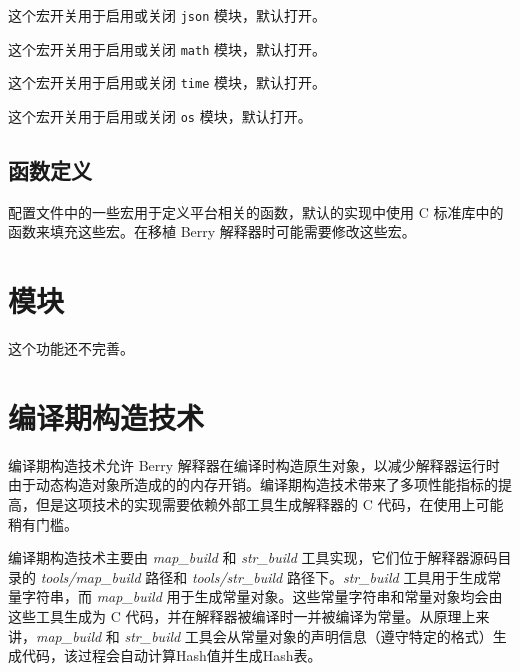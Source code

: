 这个宏开关用于启用或关闭 \texttt{json} 模块，默认打开。


这个宏开关用于启用或关闭 \texttt{math} 模块，默认打开。


这个宏开关用于启用或关闭 \texttt{time} 模块，默认打开。


这个宏开关用于启用或关闭 \texttt{os} 模块，默认打开。

\subsection{函数定义}

配置文件中的一些宏用于定义平台相关的函数，默认的实现中使用 C 标准库中的函数来填充这些宏。在移植 Berry 解释器时可能需要修改这些宏。











\section{模块}

这个功能还不完善。

\section{编译期构造技术} \label{section::precompiled_build}

编译期构造技术允许 Berry 解释器在编译时构造原生对象，以减少解释器运行时由于动态构造对象所造成的的内存开销。编译期构造技术带来了多项性能指标的提高，但是这项技术的实现需要依赖外部工具生成解释器的 C 代码，在使用上可能稍有门槛。

编译期构造技术主要由 \textsl{map\_build} 和 \textsl{str\_build} 工具实现，它们位于解释器源码目录的 \textsl{tools/map\_build} 路径和 \textsl{tools/str\_build} 路径下。\textsl{str\_build} 工具用于生成常量字符串，而 \textsl{map\_build} 用于生成常量对象。这些常量字符串和常量对象均会由这些工具生成为 C 代码，并在解释器被编译时一并被编译为常量。从原理上来讲，\textsl{map\_build} 和 \textsl{str\_build} 工具会从常量对象的声明信息（遵守特定的格式）生成代码，该过程会自动计算Hash值并生成Hash表。

